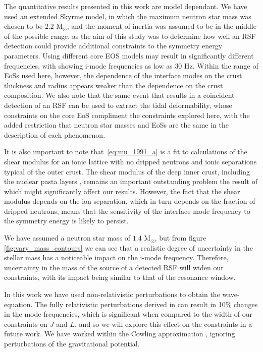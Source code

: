\documentclass[fleqn,usenatbib]{mnras}
\begin{document}
The quantitative results presented in this work are model dependant. We have used an extended Skyrme model, in which the maximum neutron star mass was chosen to be $2.2$ M$_{\odot}$, and the moment of inertia was assumed to be in the middle of the possible range, as the aim of this study was to determine how well an RSF detection could provide additional constraints to the symmetry energy parameters. 
Using different core EOS models may result in significantly different frequencies, with \citet{tsang2012resonant} showing i-mode frequencies as low as $30$ Hz. Within the range of EoSs used here, however, the dependence of the interface modes on the crust thickness and radius appears weaker than the dependence on the crust composition. We also note that the same event that results in a coincident detection of an RSF can be used to extract the tidal deformability, whose constraints on the core EoS compliment the constraints explored here, with the added restriction that neutron star masses and EoSs are the same in the description of each phenomenon. 

It is also important to note that~\ref{eq:mu_1991_a} is a fit to calculations of the shear modulus for an ionic lattice with no dripped neutrons and ionic separations typical of the outer crust. The shear modulus of the deep inner crust, including the nuclear pasta layers \citep{Pethick:1998aa}, remains an important outstanding problem the result of which might significantly affect our results. However, the fact that the shear modulus depends on the ion separation, which in turn depends on the fraction of dripped neutrons, means that the sensitivity of the interface mode frequency to the symmetry energy is likely to persist.





We have assumed a neutron star mass of $1.4$ M$_{\odot}$, but from figure \ref{fig:vary_mass_contours} we can see that a realistic degree of uncertainty in the stellar mass \citep{abbott2017gw170817} has a noticeable impact on the i-mode frequency. Therefore, uncertainty in the mass of the source of a detected RSF will widen our constraints, with its impact being similar to that of the resonance window. 

In this work we have used non-relativistic perturbations to obtain the wave-equation. The fully relativistic perturbations derived in \citet{yoshida2002nonradial} can result in 10\% changes in the mode frequencies, which is significant when compared to the width of our constraints on $J$ and $L$, and so we will explore this effect on the constraints in a future work. We have worked within the Cowling approximation \citep{cowling1941non}, ignoring perturbations of the gravitational potential. 
\end{document}
